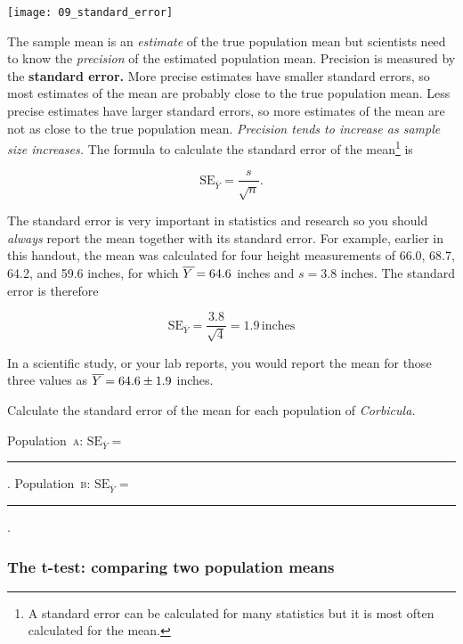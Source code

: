 \documentclass[12pt]{exam}
\newcommand*\meanY{\overline{Y\kern1.67pt}\kern-1.67pt}
\newcommand*\meansubY{\overline{Y}}
\newcommand*\Popa{Population~\textsc{a}}
\newcommand*\Popb{Population~\textsc{b}}
\newcommand*\AnswerBlank{\rule{0.75in}{0.4pt}\kern0.67pt.}
\begin{document}
\begin{questions}
\hfil\begin{minipage}{0.8\textwidth}
	\texttt{[image: 09\_standard\_error]}
\end{minipage}\hfill

\bigskip

The sample mean is an \emph{estimate} of the true population mean but scientists 
need to know the \emph{precision} of the estimated population mean. Precision 
is measured by the \textbf{standard error.} More precise estimates have smaller 
standard errors, so most estimates of the mean are probably close to the true population mean. Less precise estimates have larger standard errors, so more estimates of the mean are not as close to the true population mean. \emph{Precision tends to increase as sample size increases.} The formula to calculate the standard error of the mean\footnote{A standard error can be calculated for many statistics but it is most often calculated for the mean.} is

\[ \mathrm{SE}_{\meansubY} = \frac{s}{\sqrt{n}}. \]

The standard error is very important in statistics and research so you should 
\emph{always} report the mean together with its standard error. 
For example, earlier in this handout, the mean was calculated for four height measurements 
of 66.0, 68.7, 64.2, and 59.6 inches, for which $\meanY = 64.6$ inches and $s=3.8$ inches. 
The standard error is therefore

\[	\mathrm{SE}_{\meansubY} = \frac{3.8}{\sqrt{4}} = 1.9\,\mathrm{inches} \]

In a scientific study, or your lab reports, you would report the mean for those three values as $\meanY = 64.6 \pm 1.9$ inches.

\question
Calculate the standard error of the mean for each population of \textit{Corbicula.}

\bigskip

\Popa{}: $\mathrm{SE}_{\meansubY} =$  \AnswerBlank{} \qquad 
\Popb{}: $\mathrm{SE}_{\meansubY} =$  \AnswerBlank{}

\bigskip

\subsubsection*{The t-test: comparing two population means}


\end{questions}
\end{document}
